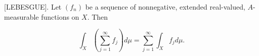 [LEBESGUE]. Let $(f_n)$ be a sequence of nonnegative, extended real-valued, $A$-measurable functions on $X$. Then

$$\int_X \left( \sum_{j=1}^{\infty} f_j \right) d\mu = \sum_{j=1}^{\infty} \int_X f_j d\mu.$$